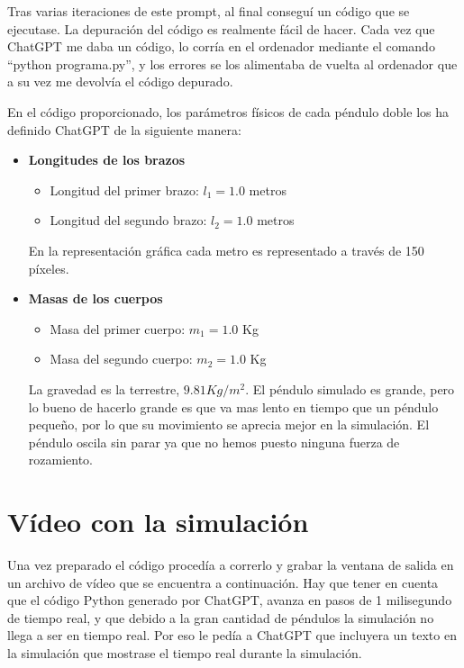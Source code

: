 \documentclass[
  10pt,
  a4paper,
  DIV=11,
  numbers=noendperiod,
  open=any]{scrreprt}
\providecommand{\tightlist}{%
  \setlength{\itemsep}{0pt}\setlength{\parskip}{0pt}}
\numberwithin{equation}{chapter}
\numberwithin{equation}{section}
\renewcommand{\[}{\begin{equation}}
\renewcommand{\]}{\end{equation}}
\begin{document}
Tras varias iteraciones de este prompt, al final conseguí un código que
se ejecutase. La depuración del código es realmente fácil de hacer. Cada
vez que ChatGPT me daba un código, lo corría en el ordenador mediante el
comando ``python programa.py'', y los errores se los alimentaba de
vuelta al ordenador que a su vez me devolvía el código depurado.

En el código proporcionado, los parámetros físicos de cada péndulo doble
los ha definido ChatGPT de la siguiente manera:

\begin{itemize}
\item
  \textbf{Longitudes de los brazos}

  \begin{itemize}
  \tightlist
  \item
    Longitud del primer brazo: \(l_1 = 1.0\) metros\\
  \item
    Longitud del segundo brazo: \(l_2 = 1.0\) metros
  \end{itemize}

  En la representación gráfica cada metro es representado a través de
  150 píxeles.
\item
  \textbf{Masas de los cuerpos}

  \begin{itemize}
  \tightlist
  \item
    Masa del primer cuerpo: \(m_1 = 1.0\) Kg
  \item
    Masa del segundo cuerpo: \(m_2 = 1.0\) Kg
  \end{itemize}

  La gravedad es la terrestre, \(9.81 Kg/m^2\). El péndulo simulado es
  grande, pero lo bueno de hacerlo grande es que va mas lento en tiempo
  que un péndulo pequeño, por lo que su movimiento se aprecia mejor en
  la simulación. El péndulo oscila sin parar ya que no hemos puesto
  ninguna fuerza de rozamiento.
\end{itemize}

\section{Vídeo con la simulación}\label{sec-abanico}

Una vez preparado el código procedía a correrlo y grabar la ventana de
salida en un archivo de vídeo que se encuentra a continuación. Hay que
tener en cuenta que el código Python generado por ChatGPT, avanza en
pasos de 1 milisegundo de tiempo real, y que debido a la gran cantidad
de péndulos la simulación no llega a ser en tiempo real. Por eso le
pedía a ChatGPT que incluyera un texto en la simulación que mostrase el
tiempo real durante la simulación.
\end{document}
